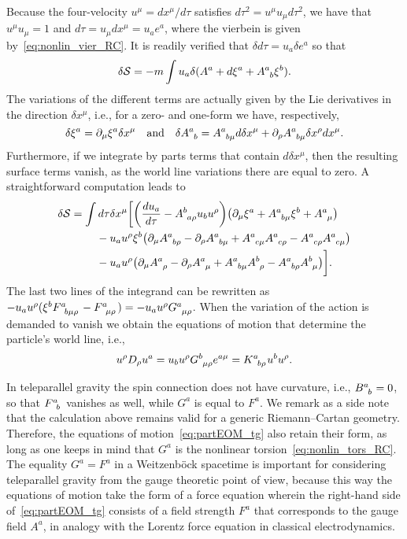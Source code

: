 \documentclass[
final,
11pt,
a4paper,
DIV=11,
headinclude=true,
footinclude=false,
bibliography=totoc,
twoside=true,  %
BCOR=5mm
]{scrbook}
\begin{document}
Because the four-velocity $u^\mu = dx^\mu/d\tau$ satisfies 
$d\tau^2 = u^\mu u_\mu d\tau^2$, we have that $u^\mu u_\mu = 1$ 
and $d\tau = u_\mu dx^\mu = u_a e^a$, where the vierbein is given 
by~\eqref{eq:nonlin_vier_RC}. It is readily verified that $\delta 
d\tau = u_a \delta e^a$ so that
\begin{equation*}
  \delta \mc{S} = -m \int u_a \delta ( A^a + d\xi^a 
  + A\ind{^a_b}\xi^b ).
\end{equation*}
The variations of the different terms are actually given by the 
Lie derivatives in the direction $\delta x^\mu$, i.e., for 
a zero- and one-form we have, respectively,
\begin{equation*}
  \delta \xi^a = \pd_\mu \xi^a \delta x^\mu
  \quad\text{and}\quad
  \delta A\ind{^a_b} = A\ind{^a_{b\mu}} d\delta x^\mu + \pd_\rho 
  A\ind{^a_{b\mu}} \delta x^\rho d x^\mu.
\end{equation*}
Furthermore, if we integrate by parts terms that contain $d\delta 
x^\mu$, then the resulting surface terms vanish, as the world 
line variations there are equal to zero. A straightforward 
computation leads to
\begin{align*}
  \delta \mc{S}
  &= \int d\tau \delta x^\mu \bigg[ \bigg( \frac{d u_a}{d\tau} 
  - A\ind{^b_{a\rho}} u_b u^\rho \bigg) \big( \pd_\mu \xi^a 
  + A\ind{^a_{b\mu}} \xi^b + A\ind{^a_\mu} \big) \\
  &\nla \hphantom{\int} - u_a u^\rho \xi^b \big( \pd_\mu 
  A\ind{^a_{b\rho}} - \pd_\rho A\ind{^a_{b\mu}} 
  + A\ind{^a_{c\mu}} A\ind{^a_{c\rho}} - A\ind{^a_{c\rho}} 
  A\ind{^a_{c\mu}} \big) \\
  &\nla \hphantom{\int} - u_a u^\rho \big( \pd_\mu A\ind{^a_\rho} 
  - \pd_\rho A\ind{^a_\mu} + A\ind{^a_{b\mu}} A\ind{^b_\rho} 
  - A\ind{^a_{b\rho}} A\ind{^b_\mu} \big) \bigg].
\end{align*}
The last two lines of the integrand can be rewritten as $-u_a 
u^\rho (\xi^b F\ind{^a_{b\mu\rho}} - F\ind{^a_{\mu\rho}}) = -u_a 
u^\rho G\ind{^a_{\mu\rho}}$. When the variation of the action is 
demanded to vanish we obtain the equations of motion that 
determine the particle's world line, i.e.,
\begin{equation}
\label{eq:partEOM_tg}
  u^\rho D_\rho u^a = u_b u^\rho G\ind{^b_{\mu \rho}} e^{a\mu}
  = K\ind{^a_{b\rho}} u^b u^\rho.
\end{equation}

In teleparallel gravity the spin connection does not have 
curvature, i.e., $B\ind{^a_b} = 0$, so that $F\ind{^a_b}$ 
vanishes as well, while $G^a$ is equal to $F^a$. We remark as 
a side note that the calculation above remains valid for 
a generic Riemann--Cartan geometry. Therefore, the equations of 
motion~\eqref{eq:partEOM_tg} also retain their form, as long as 
one keeps in mind that $G^a$ is the nonlinear 
torsion~\eqref{eq:nonlin_tors_RC}. The equality $G^a = F^a$ in 
a Weitzenb\"ock spacetime is important for considering 
teleparallel gravity from the gauge theoretic point of view, 
because this way the equations of motion take the form of a force 
equation wherein the right-hand side of~\eqref{eq:partEOM_tg} 
consists of a field strength $F^a$ that corresponds to the gauge 
field $A^a$, in analogy with the Lorentz force equation in 
classical electrodynamics.
\end{document}
